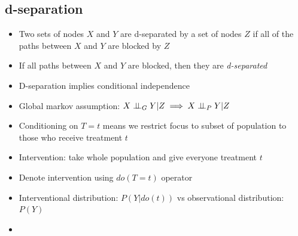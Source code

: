 \documentclass[../main.tex]{subfiles}
\begin{document}
  \subsection{d-separation}
    \begin{itemize}
      \item Two sets of nodes $X$ and $Y$ are d-separated by a set of nodes $Z$ if all of the paths between $X$ and $Y$ are blocked by $Z$
      \item If all paths between $X$ and $Y$ are blocked, then they are \textit{d-separated}
      \item D-separation implies conditional independence
      \item Global markov assumption: $X \perp\!\!\!\perp_{G} Y | Z \implies X \perp\!\!\!\perp_{P} Y | Z$
      \item Conditioning on $T = t$ means we restrict focus to subset of population to those who receive treatment $t$
      \item Intervention: take whole population and give everyone treatment $t$
      \item Denote intervention using $do(T = t)$ operator
      \item Interventional distribution: $P(Y|do(t))$ vs observational distribution: $P(Y)$
      \item
    \end{itemize}
\end{document}

